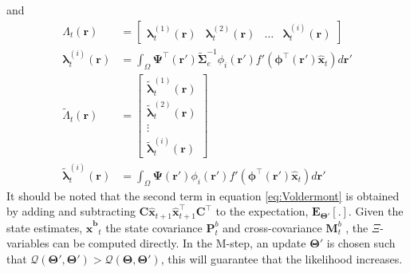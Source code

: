 \documentclass[]{article}
\begin{document}
and
\begin{align}
	 \Lambda_t(\mathbf r)&=\begin{bmatrix}\boldsymbol \lambda_t^{(1)}(\mathbf r) & \boldsymbol \lambda_t^{(2)}(\mathbf r)& \dots &\boldsymbol \lambda_t^{(i)}(\mathbf r)\end{bmatrix} \label{eq:Lambda}\\
	 \boldsymbol\lambda_t^{(i)}(\mathbf r)&=\int_{\Omega} \boldsymbol \Psi^\top(\mathbf r')\tilde{\boldsymbol\Sigma}_e^{-1}\phi_i(\mathbf r')f'(\boldsymbol\phi^\top(\mathbf r')\mathbf {\hat x}_t)d\mathbf r'\label{eq:lambdai}\\
	\tilde{\Lambda}_t(\mathbf r)&=\begin{bmatrix}\tilde{\boldsymbol \lambda}_t^{(1)}(\mathbf r) \\ \tilde{\boldsymbol \lambda}_t^{(2)}(\mathbf r) \\ \vdots \\ \tilde{\boldsymbol \lambda}_t^{(i)}(\mathbf r)\end{bmatrix} \label{eq:Lambdatilde}\\
	 \tilde{\boldsymbol \lambda}_t^{(i)}(\mathbf r)&=\int_{\Omega} \boldsymbol \Psi(\mathbf r')\phi_i(\mathbf r')f'(\boldsymbol\phi^\top(\mathbf r')\mathbf {\hat x}_t)d\mathbf r' \label{eq:lambdatildei}
\end{align}
It should be noted that the second term in equation \ref{eq:Voldermont} is obtained by adding and subtracting $\mathbf C \mathbf{\hat{x}}_{t+1} \mathbf{\hat{x}}_{t+1}^\top \mathbf C^\top$ to the expectation, $\mathbf E_{\boldsymbol\Theta'}\left[ .\right] $. Given the state estimates, $\mathbf {\hat x^{b}}_t$ the state covariance $\mathbf P_t^b$ and cross-covariance $\mathbf M_t^b$ , the $\Xi$-variables can be computed directly. In the M-step, an update $\boldsymbol\Theta'$ is chosen such that $\mathcal{Q}\left(\boldsymbol\Theta',\boldsymbol\Theta'\right)>\mathcal{Q}\left(\boldsymbol\Theta,\boldsymbol\Theta'\right)$, this will guarantee that the likelihood increases. 
\end{document}
